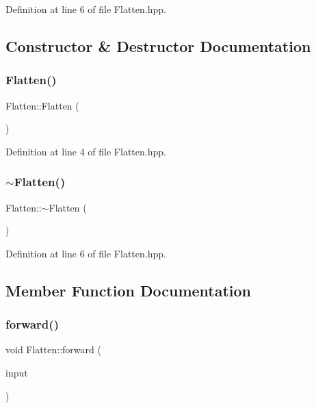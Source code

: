 Definition at line 6 of file Flatten.\+hpp.



\subsection{Constructor \& Destructor Documentation}
\mbox{\label{class_flatten_ab8e78a47501be2fa2b7e34f9b92e491a}} 
\subsubsection{\texorpdfstring{Flatten()}{Flatten()}}
{\footnotesize\ttfamily Flatten\+::\+Flatten (\begin{DoxyParamCaption}{ }\end{DoxyParamCaption})}



Definition at line 4 of file Flatten.\+hpp.

\mbox{\label{class_flatten_a5542c21b0de6d9fb820eb0616d32ea4d}} 
\subsubsection{\texorpdfstring{$\sim$\+Flatten()}{~Flatten()}}
{\footnotesize\ttfamily Flatten\+::$\sim$\+Flatten (\begin{DoxyParamCaption}{ }\end{DoxyParamCaption})}



Definition at line 6 of file Flatten.\+hpp.



\subsection{Member Function Documentation}
\mbox{\label{class_flatten_acc0cfdfd9736b2908dae4ccf2006df02}} 
\subsubsection{\texorpdfstring{forward()}{forward()}}
{\footnotesize\ttfamily void Flatten\+::forward (\begin{DoxyParamCaption}\item[{std\+::vector$<$ Eigen\+::\+Matrix\+Xd $>$}]{input }\end{DoxyParamCaption})\hspace{0.3cm}{\ttfamily [virtual]}}



